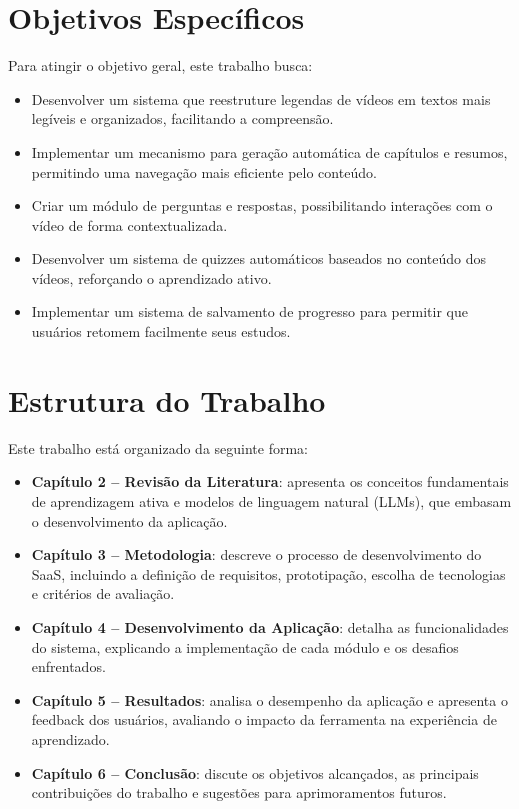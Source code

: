 \documentclass[tcc,capa]{texufpel}
\begin{document}
\section{Objetivos Específicos}

Para atingir o objetivo geral, este trabalho busca:

\begin{itemize}
    \item Desenvolver um sistema que reestruture legendas de vídeos em textos mais legíveis e organizados, facilitando a compreensão.
    \item Implementar um mecanismo para geração automática de capítulos e resumos, permitindo uma navegação mais eficiente pelo conteúdo.
    \item Criar um módulo de perguntas e respostas, possibilitando interações com o vídeo de forma contextualizada.
    \item Desenvolver um sistema de quizzes automáticos baseados no conteúdo dos vídeos, reforçando o aprendizado ativo.
    \item Implementar um sistema de salvamento de progresso para permitir que usuários retomem facilmente seus estudos.
\end{itemize}

\section{Estrutura do Trabalho}
Este trabalho está organizado da seguinte forma:

\begin{itemize}
    \item \textbf{Capítulo 2 – Revisão da Literatura}: apresenta os conceitos fundamentais de aprendizagem ativa e modelos de linguagem natural (LLMs), que embasam o desenvolvimento da aplicação.  
    \item \textbf{Capítulo 3 – Metodologia}: descreve o processo de desenvolvimento do SaaS, incluindo a definição de requisitos, prototipação, escolha de tecnologias e critérios de avaliação.  
    \item \textbf{Capítulo 4 – Desenvolvimento da Aplicação}: detalha as funcionalidades do sistema, explicando a implementação de cada módulo e os desafios enfrentados.  
    \item \textbf{Capítulo 5 – Resultados}: analisa o desempenho da aplicação e apresenta o feedback dos usuários, avaliando o impacto da ferramenta na experiência de aprendizado.  
    \item \textbf{Capítulo 6 – Conclusão}: discute os objetivos alcançados, as principais contribuições do trabalho e sugestões para aprimoramentos futuros.  
\end{itemize}
\end{document}
